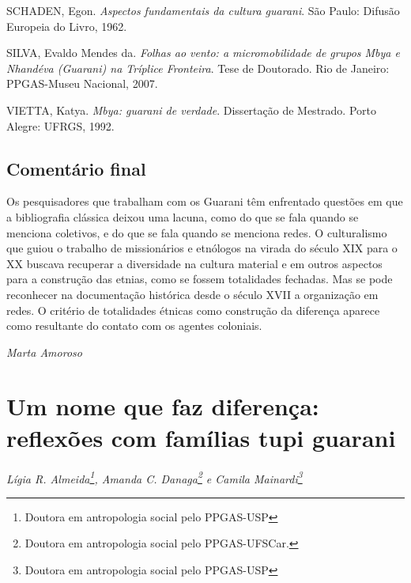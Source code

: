 SCHADEN, Egon. \emph{Aspectos fundamentais da cultura guarani}. São Paulo:
Difusão Europeia do Livro, 1962.

SILVA, Evaldo Mendes da. \emph{Folhas ao vento: a micromobilidade de grupos
Mbya e Nhandéva (Guarani) na Tríplice Fronteira}. Tese de Doutorado. Rio
de Janeiro: PPGAS-Museu Nacional, 2007.

VIETTA, Katya. \emph{Mbya: guarani de verdade}. Dissertação de Mestrado. Porto
Alegre: UFRGS, 1992.


\section{Comentário final}
Os pesquisadores que trabalham com os Guarani têm enfrentado questões em
que a bibliografia clássica deixou uma lacuna, como do que se fala
quando se menciona coletivos, e do que se fala quando se menciona
redes. O culturalismo que guiou o trabalho de missionários e etnólogos
na virada do século XIX para o XX buscava recuperar a diversidade na
cultura material e em outros aspectos para a construção das etnias,
como se fossem totalidades fechadas. Mas se pode reconhecer na
documentação histórica desde o século XVII a organização em redes. O
critério de totalidades étnicas como construção da diferença aparece
como resultante do contato com os agentes coloniais.
\medskip
\begin{flushright}
\emph{Marta Amoroso}
\end{flushright}

\chapter{Um nome que faz diferença: reflexões com famílias tupi guarani}
\begin{flushright}
\emph{Lígia R. Almeida\footnote{Doutora em antropologia social pelo
PPGAS-USP}, Amanda C. Danaga\footnote{Doutora em antropologia
social pelo PPGAS-UFSCar.} e Camila Mainardi\footnote{Doutora em antropologia social pelo PPGAS-USP}}
\end{flushright}
\medskip
%

